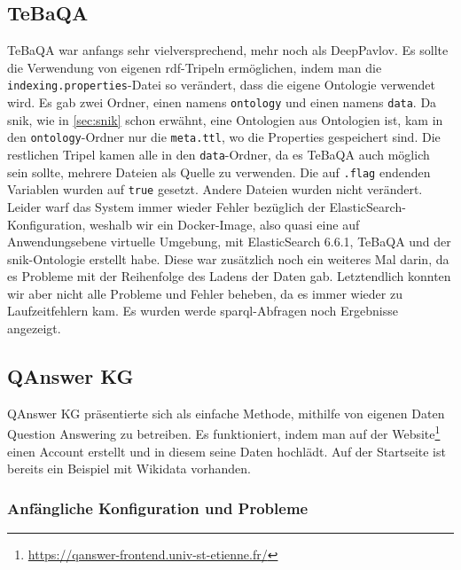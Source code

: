 \subsection{TeBaQA}
TeBaQA war anfangs sehr vielversprechend, mehr noch als DeepPavlov.
Es sollte die Verwendung von eigenen \ac{rdf}-Tripeln ermöglichen, indem man die \texttt{indexing.properties}-Datei so verändert, dass die eigene Ontologie verwendet wird.
Es gab zwei Ordner, einen namens \texttt{ontology} und einen namens \texttt{data}.
Da \ac{snik}, wie in \cref{sec:snik} schon erwähnt, eine Ontologien aus Ontologien ist, kam in den \texttt{ontology}-Ordner nur die \texttt{meta.ttl}, wo die Properties gespeichert sind.
Die restlichen Tripel kamen alle in den \texttt{data}-Ordner, da es TeBaQA auch möglich sein sollte, mehrere Dateien als Quelle zu verwenden.
Die auf \texttt{.flag} endenden Variablen wurden auf \texttt{true} gesetzt.
Andere Dateien wurden nicht verändert.
Leider warf das System immer wieder Fehler bezüglich der ElasticSearch-Konfiguration, weshalb wir ein Docker-Image,
also quasi eine auf Anwendungsebene virtuelle Umgebung, mit ElasticSearch 6.6.1, TeBaQA und der \ac{snik}-Ontologie erstellt habe.
Diese war zusätzlich noch ein weiteres Mal darin, da es Probleme mit der Reihenfolge des Ladens der Daten gab.
Letztendlich konnten wir aber nicht alle Probleme und Fehler beheben, da es immer wieder zu Laufzeitfehlern kam.
Es wurden werde \ac{sparql}-Abfragen noch Ergebnisse angezeigt.

\subsection{QAnswer KG}

QAnswer KG präsentierte sich als einfache Methode, mithilfe von eigenen Daten Question Answering zu betreiben.
Es funktioniert, indem man auf der Website\footnote{\url{https://qanswer-frontend.univ-st-etienne.fr/}} einen Account erstellt und in diesem seine Daten hochlädt.
Auf der Startseite ist bereits ein Beispiel mit Wikidata vorhanden.

\subsubsection{Anfängliche Konfiguration und Probleme}

